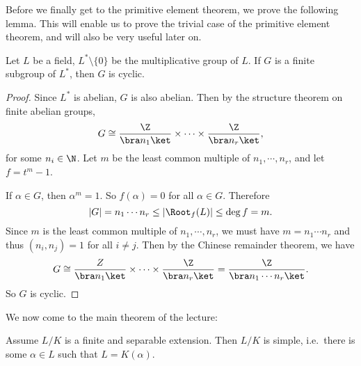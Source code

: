 \documentclass[a4paper]{article}
\begin{document}
Before we finally get to the primitive element theorem, we prove the following lemma. This will enable us to prove the trivial case of the primitive element theorem, and will also be very useful later on.
\begin{lemma}
  Let $L$ be a field, $L^*\setminus \{0\}$ be the multiplicative group of $L$. If $G$ is a finite subgroup of $L^*$, then $G$ is cyclic.
\end{lemma}

\begin{proof}
  Since $L^*$ is abelian, $G$ is also abelian. Then by the structure theorem on finite abelian groups,
  \[
    G \cong \frac{\Z}{\bra n_1\ket} \times \cdots \times \frac{\Z}{\bra n_r\ket},
  \]
  for some $n_i \in \N$. Let $m$ be the least common multiple of $n_1, \cdots, n_r$, and let $f = t^m - 1$.

  If $\alpha \in G$, then $\alpha^m = 1$. So $f(\alpha) = 0$ for all $\alpha \in G$. Therefore
  \[
    |G| = n_1 \cdots n_r \leq |\Root_f(L)| \leq \deg f = m.
  \]
  Since $m$ is the least common multiple of $n_1, \cdots, n_r$, we must have $m = n_1 \cdots n_r$ and thus $(n_i, n_j) = 1$ for all $i \not= j$. Then by the Chinese remainder theorem, we have
  \[
    G \cong \frac{Z}{\bra n_1\ket} \times \cdots \times \frac{\Z}{\bra n_r\ket} = \frac{\Z}{\bra n_1 \cdots n_r\ket}.
  \]
  So $G$ is cyclic.
\end{proof}
We now come to the main theorem of the lecture:
\begin{thm}
  Assume $L/K$ is a finite and separable extension. Then $L/K$ is simple, i.e.\ there is some $\alpha \in L$ such that $L = K(\alpha)$.
\end{thm}
\end{document}
